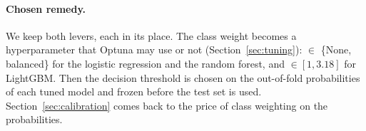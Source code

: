 \paragraph{Chosen remedy.} We keep both levers, each in its place. The class
weight becomes a hyperparameter that Optuna may use or not
(Section~\ref{sec:tuning}):  $\in$ \{None, balanced\} for
the logistic regression and the random forest, and 
$\in [1, 3.18]$ for LightGBM. Then the decision threshold is chosen on the
out-of-fold probabilities of each tuned model and frozen before the test set
is used. Section~\ref{sec:calibration} comes back to the price of class
weighting on the probabilities.
